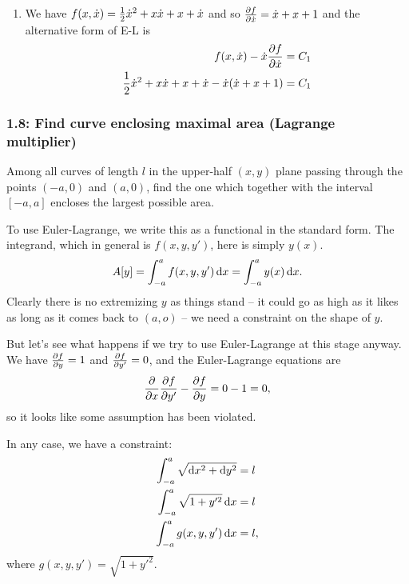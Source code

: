 \begin{enumerate}[label=(\alph*)]
\item We have $f(x, \dot{x}) = \frac{1}{2}\dot{x}^2 + x\dot{x} + x + \dot{x}$ and so $\frac{\partial f}{\partial \dot{x}} = \dot{x} + x + 1$ and the alternative form of E-L is
\begin{align*}
  f(x, \dot{x}) - \dot{x}\frac{\partial f}{\partial \dot{x}} &= C_1 \\
  \frac{1}{2}\dot{x}^2 + x\dot{x} + x + \dot{x} - \dot{x}(\dot{x} + x + 1) &= C_1
\end{align*}



\end{enumerate}
\subsubsection{1.8: Find curve enclosing maximal area (Lagrange multiplier)}
\begin{mdframed}
  Among all curves of length $l$ in the upper-half $(x, y)$ plane passing through the points $(-a, 0)$
  and $(a, 0)$, find the one which together with the interval $[-a, a]$ encloses the largest possible area.
\end{mdframed}

To use Euler-Lagrange, we write this as a functional in the standard form. The integrand, which in general
is $f(x, y, y')$, here is simply $y(x)$.
\begin{align*}
  A[y] = \int_{-a}^{a} f(x, y, y') \dx = \int_{-a}^{a} y(x) \dx.
\end{align*}
Clearly there is no extremizing $y$ as things stand -- it could go as high as it likes as long as it comes back
to $(a, o)$ -- we need a constraint on the shape of $y$.

But let's see what happens if we try to use Euler-Lagrange at this stage anyway. We have $\frac{\partial f}{\partial y} = 1$
and $\frac{\partial f}{\partial y'} = 0$, and the Euler-Lagrange equations are
\begin{align*}
  \frac{\partial}{\partial x} \frac{\partial f}{\partial y'} - \frac{\partial f}{\partial y} = 0 - 1 = 0,
\end{align*}
so it looks like some assumption has been violated.

In any case, we have a constraint:
\begin{align*}
  \int_{-a}^a \sqrt{\dx^2 + \dy^2} &= l \\
  \int_{-a}^a \sqrt{1 + y'^2} \dx &= l \\
  \int_{-a}^a g(x, y, y') \dx &= l,
\end{align*}
where $g(x,y,y') = \sqrt{1 + y'^2}$.

